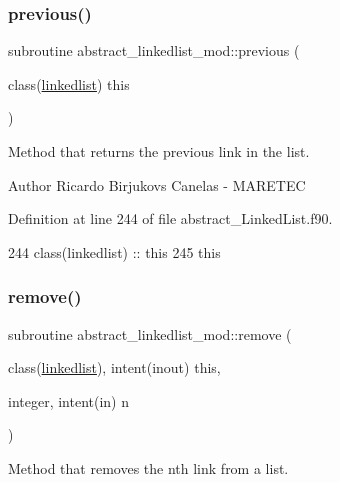 \subsubsection{\texorpdfstring{previous()}{previous()}}
{\footnotesize\ttfamily subroutine abstract\+\_\+linkedlist\+\_\+mod\+::previous (\begin{DoxyParamCaption}\item[{class(\mbox{\hyperlink{structabstract__linkedlist__mod_1_1linkedlist}{linkedlist}})}]{this }\end{DoxyParamCaption})\hspace{0.3cm}{\ttfamily [private]}}



Method that returns the previous link in the list. 

\begin{DoxyAuthor}{Author}
Ricardo Birjukovs Canelas -\/ M\+A\+R\+E\+T\+EC 
\end{DoxyAuthor}


Definition at line 244 of file abstract\+\_\+\+Linked\+List.\+f90.


\begin{DoxyCode}
244     \textcolor{keywordtype}{class}(linkedlist) :: this
245     this%
\end{DoxyCode}
\mbox{\label{namespaceabstract__linkedlist__mod_a9f4028744d1ca6536e28c76d2795ace3}} 
\subsubsection{\texorpdfstring{remove()}{remove()}}
{\footnotesize\ttfamily subroutine abstract\+\_\+linkedlist\+\_\+mod\+::remove (\begin{DoxyParamCaption}\item[{class(\mbox{\hyperlink{structabstract__linkedlist__mod_1_1linkedlist}{linkedlist}}), intent(inout)}]{this,  }\item[{integer, intent(in)}]{n }\end{DoxyParamCaption})\hspace{0.3cm}{\ttfamily [private]}}



Method that removes the nth link from a list. 

